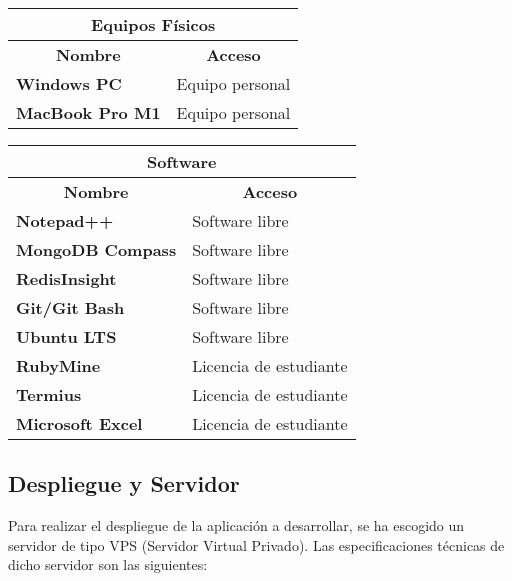 \begin{center}
	\begin{tabular}{ | l | p{10cm} |}
		\hline
		\multicolumn{2}{|c|}{\textbf{Equipos Físicos}} \\
		\hline
		\multicolumn{1}{|c|}{\textbf{Nombre}} & \multicolumn{1}{|c|}{\textbf{Acceso}} \\
		\hline
		{\textbf{Windows PC}} & Equipo personal \\ \hline
		
		{\textbf{MacBook Pro M1}} & Equipo personal \\ \hline
	\end{tabular}
\end{center}

\begin{center}
	\begin{tabular}{ | l | p{10cm} |}
		\hline
		\multicolumn{2}{|c|}{\textbf{Software}} \\
		\hline
		\multicolumn{1}{|c|}{\textbf{Nombre}} & \multicolumn{1}{|c|}{\textbf{Acceso}} \\
		\hline
		
		{\textbf{Notepad++}} & Software libre \\ \hline
		
		{\textbf{MongoDB Compass}} & Software libre \\ \hline
		
		{\textbf{RedisInsight}} & Software libre \\ \hline
		
		{\textbf{Git/Git Bash}} & Software libre \\ \hline
		
		{\textbf{Ubuntu LTS}} & Software libre \\ \hline
		
		{\textbf{RubyMine}} & Licencia de estudiante \\ \hline
		
		{\textbf{Termius}} & Licencia de estudiante \\ \hline
		
		{\textbf{Microsoft Excel}} & Licencia de estudiante \\ \hline
	\end{tabular}
\end{center}

\subsection{Despliegue y Servidor}
Para realizar el despliegue de la aplicación a desarrollar, se ha escogido un servidor de tipo VPS (Servidor Virtual Privado). Las especificaciones técnicas de dicho servidor son las siguientes:

